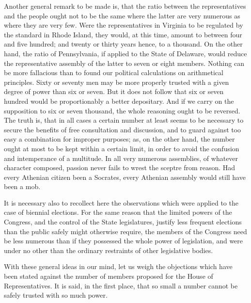 Another general remark to be made is, that the ratio between the representatives and the people ought not to be the same where the latter are very numerous as where they are very few. Were the representatives in Virginia to be regulated by the standard in Rhode Island, they would, at this time, amount to between four and five hundred; and twenty or thirty years hence, to a thousand. On the other hand, the ratio of Pennsylvania, if applied to the State of Delaware, would reduce the representative assembly of the latter to seven or eight members. Nothing can be more fallacious than to found our political calculations on arithmetical principles. Sixty or seventy men may be more properly trusted with a given degree of power than six or seven. But it does not follow that six or seven hundred would be proportionably a better depositary. And if we carry on the supposition to six or seven thousand, the whole reasoning ought to be reversed. The truth is, that in all cases a certain number at least seems to be necessary to secure the benefits of free consultation and discussion, and to guard against too easy a combination for improper purposes; as, on the other hand, the number ought at most to be kept within a certain limit, in order to avoid the confusion and intemperance of a multitude. In all very numerous assemblies, of whatever character composed, passion never fails to wrest the sceptre from reason. Had every Athenian citizen been a Socrates, every Athenian assembly would still have been a mob.

It is necessary also to recollect here the observations which were applied to the case of biennial elections. For the same reason that the limited powers of the Congress, and the control of the State legislatures, justify less frequent elections than the public safely might otherwise require, the members of the Congress need be less numerous than if they possessed the whole power of legislation, and were under no other than the ordinary restraints of other legislative bodies.

With these general ideas in our mind, let us weigh the objections which have been stated against the number of members proposed for the House of Representatives. It is said, in the first place, that so small a number cannot be safely trusted with so much power.

